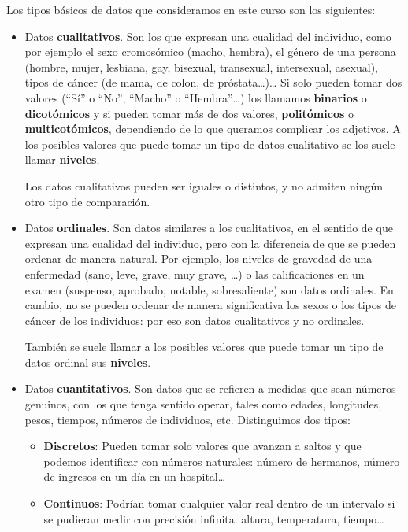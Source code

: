 \documentclass[
  letterpaper,
  DIV=11,
  numbers=noendperiod]{scrreprt}
\begin{document}

Los tipos básicos de datos que consideramos en este curso son los
siguientes:

\begin{itemize}
\item
  Datos \textbf{cualitativos}. Son los que expresan una cualidad del
  individuo, como por ejemplo el sexo cromosómico (macho, hembra), el
  género de una persona (hombre, mujer, lesbiana, gay, bisexual,
  transexual, intersexual, asexual), tipos de cáncer (de mama, de colon,
  de próstata\ldots)\ldots{} Si solo pueden tomar dos valores (``Sí'' o
  ``No'', ``Macho'' o ``Hembra''\ldots) los llamamos \textbf{binarios} o
  \textbf{dicotómicos} y si pueden tomar más de dos valores,
  \textbf{politómicos} o \textbf{multicotómicos}, dependiendo de lo que
  queramos complicar los adjetivos. A los posibles valores que puede
  tomar un tipo de datos cualitativo se los suele llamar
  \textbf{niveles}.

  Los datos cualitativos pueden ser iguales o distintos, y no admiten
  ningún otro tipo de comparación.
\item
  Datos \textbf{ordinales}. Son datos similares a los cualitativos, en
  el sentido de que expresan una cualidad del individuo, pero con la
  diferencia de que se pueden ordenar de manera natural. Por ejemplo,
  los niveles de gravedad de una enfermedad (sano, leve, grave, muy
  grave, \ldots) o las calificaciones en un examen (suspenso, aprobado,
  notable, sobresaliente) son datos ordinales. En cambio, no se pueden
  ordenar de manera significativa los sexos o los tipos de cáncer de los
  individuos: por eso son datos cualitativos y no ordinales.

  También se suele llamar a los posibles valores que puede tomar un tipo
  de datos ordinal sus \textbf{niveles}.
\item
  Datos \textbf{cuantitativos}. Son datos que se refieren a medidas que
  sean números genuinos, con los que tenga sentido operar, tales como
  edades, longitudes, pesos, tiempos, números de individuos, etc.
  Distinguimos dos tipos:

  \begin{itemize}
  \item
    \textbf{Discretos}: Pueden tomar solo valores que avanzan a saltos y
    que podemos identificar con números naturales: número de hermanos,
    número de ingresos en un día en un hospital\ldots{}
  \item
    \textbf{Continuos}: Podrían tomar cualquier valor real dentro de un
    intervalo si se pudieran medir con precisión infinita: altura,
    temperatura, tiempo\ldots{}
  \end{itemize}
\end{itemize}
\end{document}
